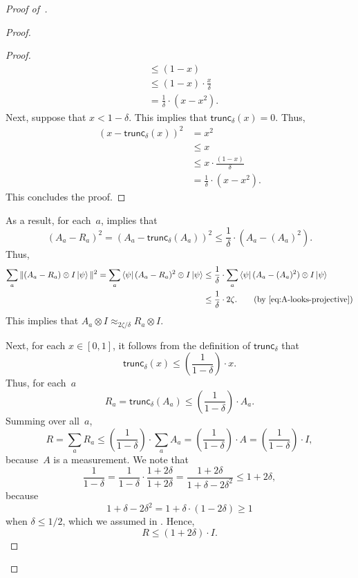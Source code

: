 \begin{proof}[Proof of~]
\begin{proof}
\begin{proof}
\begin{align*}
 &\leq (1-x)\\
&\leq (1-x) \cdot \frac{x}{\delta} \tag{because $x \geq \delta$}\\
&= \frac{1}{\delta} \cdot (x - x^2).
\end{align*}
Next, suppose that $x < 1 -\delta$.
This implies that $\mathsf{trunc}_\delta(x) = 0$.
Thus,
\begin{align*}
(x - \mathsf{trunc}_\delta(x))^2
& = x^2\\
 &\leq x\\
&\leq x \cdot \frac{(1-x)}{\delta} \tag{because $x \leq 1- \delta$}\\
&= \frac{1}{\delta} \cdot (x - x^2).
\end{align*}
This concludes the proof.
\end{proof}

As a result, for each~$a$,  implies that
\begin{equation*}
(A_a - R_a)^2 = (A_a - \mathsf{trunc}_\delta(A_a))^2 \leq \frac{1}{\delta} \cdot (A_a - (A_a)^2).
\end{equation*}
Thus,
\begin{align*}
\sum_a \Vert (A_a - R_a) \ot I \ket{\psi}\Vert^2
= \sum_a \bra{\psi} (A_a - R_a)^2 \ot I\ket{\psi}
&\leq \frac{1}{\delta} \cdot \sum_a \bra{\psi} (A_a - (A_a)^2) \ot I \ket{\psi}\\
&\leq \frac{1}{\delta} \cdot 2\zeta. \tag{by \Cref{eq:A-looks-projective}}
\end{align*}
This implies that $A_a \otimes I \approx_{2\zeta/\delta} R_a \otimes I$.

Next, for each $x \in [0, 1]$, it follows from the definition of $\mathsf{trunc}_\delta$ that
\begin{equation*}
\mathsf{trunc}_\delta(x) \leq \left(\frac{1}{1-\delta}\right) \cdot x.
\end{equation*}
Thus, for each~$a$
\begin{equation*}
R_a = \mathsf{trunc}_\delta(A_a) \leq \left(\frac{1}{1-\delta}\right) \cdot A_a.
\end{equation*}
Summing over all~$a$,
\begin{equation*}
R = \sum_a R_a \leq \left(\frac{1}{1-\delta}\right) \cdot \sum_a A_a = \left(\frac{1}{1-\delta}\right) \cdot A
= \left(\frac{1}{1-\delta}\right) \cdot I,
\end{equation*}
because~$A$ is a measurement.
We note that
\begin{equation*}
\frac{1}{1-\delta}
= \frac{1}{1-\delta} \cdot \frac{1 + 2\delta}{1 + 2\delta}
= \frac{1 + 2\delta}{1 + \delta - 2\delta^2}
\leq 1 + 2\delta,
\end{equation*}
because
\begin{equation*}
1 + \delta - 2\delta^2 = 1 + \delta\cdot(1-2\delta)\geq 1
\end{equation*}
when $\delta \leq 1/2$,
which we assumed in .
Hence,
\begin{equation*}
R \leq (1+ 2\delta) \cdot I.
\end{equation*}



\end{proof}
\end{proof}
